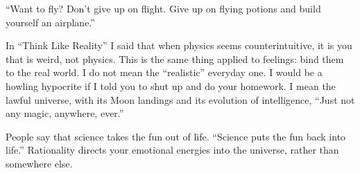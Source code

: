 ``Want to fly? Don't give up on flight. Give up on flying potions and build yourself an airplane.'' 

In ``Think Like Reality'' I said that when physics seems counterintuitive, it is you that is weird, not physics. This is the same thing applied to feelings: bind them to the real world. I do not mean the ``realistic'' everyday one. I would be a howling hypocrite if I told you to shut up and do your homework. I mean the lawful universe, with its Moon landings and its evolution of intelligence, ``Just not any magic, anywhere, ever.''

People say that science takes the fun out of life. ``Science puts the fun back into life.'' Rationality directs your emotional energies into the universe, rather than somewhere else.
